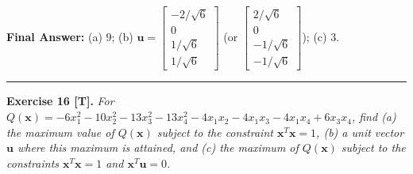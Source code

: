\documentclass[11pt, letterpaper]{article}
\theoremstyle{definition}
\theoremstyle{remark}
\begin{document}
\textbf{Final Answer:} (a) $9$; \quad (b) $\mathbf{u} = \begin{bmatrix} -2/\sqrt{6} \\ 0 \\ 1/\sqrt{6} \\ 1/\sqrt{6} \end{bmatrix}$ (or $\begin{bmatrix} 2/\sqrt{6} \\ 0 \\ -1/\sqrt{6} \\ -1/\sqrt{6} \end{bmatrix}$); \quad (c) $3$.

\medskip
\hrule
\medskip

\textbf{Exercise 16 [T].} \emph{For $Q(\mathbf{x}) = -6x_1^2 - 10x_2^2 - 13x_3^2 - 13x_4^2 - 4x_1x_2 - 4x_1x_3 - 4x_1x_4 + 6x_3x_4$, find (a) the maximum value of $Q(\mathbf{x})$ subject to the constraint $\mathbf{x}^T\mathbf{x} = 1$, (b) a unit vector $\mathbf{u}$ where this maximum is attained, and (c) the maximum of $Q(\mathbf{x})$ subject to the constraints $\mathbf{x}^T\mathbf{x} = 1$ and $\mathbf{x}^T\mathbf{u} = 0$.}
\end{document}
